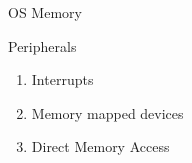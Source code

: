 \documentclass{beamer}
\begin{document}
\begin{frame}{OS Memory}
\begin{center}
{}
\end{center}
\end{frame}

\begin{frame}[t]{Peripherals}
  \begin{enumerate}
  \item<1-> Interrupts
  \item<2-> Memory mapped devices
  \item<4-> Direct Memory Access
\end{enumerate}
\begin{center}
\end{center}
\end{frame}
\end{document}
